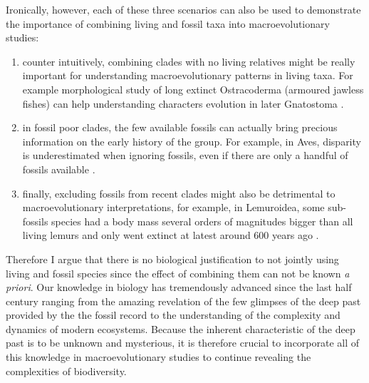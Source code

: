Ironically, however, each of these three scenarios can also be used to demonstrate the importance of combining living and fossil taxa into macroevolutionary studies:
\begin{enumerate}
\item counter intuitively, combining clades with no living relatives might be really important for understanding macroevolutionary patterns in living taxa. For example morphological study of long extinct Ostracoderma (armoured jawless fishes) can help understanding characters evolution in later Gnatostoma \citep[jawed vertebrates;][]{Janvier2015}.
\item in fossil poor clades, the few available fossils can actually bring precious information on the early history of the group. For example, in Aves, disparity is underestimated when ignoring fossils, even if there are only a handful of fossils available \citep[e.g. 58 fossil genera against 604 living ones;][]{Mitchell2015}.
\item finally, excluding fossils from recent clades might also be detrimental to macroevolutionary interpretations, for example, in Lemuroidea, some sub-fossils species had a body mass several orders of magnitudes bigger than all living lemurs \citep{hartwig2002primate,Jungers2008} and only went extinct at latest around 600 years ago \citep{goodman2003introduction}.
\end{enumerate}

Therefore I argue that there is no biological justification to not jointly using living and fossil species since the effect of combining them can not be known \textit{a priori}.
Our knowledge in biology has tremendously advanced since the last half century ranging from the amazing revelation of the few glimpses of the deep past provided by the the fossil record to the understanding of the complexity and dynamics of modern ecosystems.
Because the inherent characteristic of the deep past is to be unknown and mysterious, it is therefore crucial to incorporate all of this knowledge in macroevolutionary studies to continue revealing the complexities of biodiversity.

%